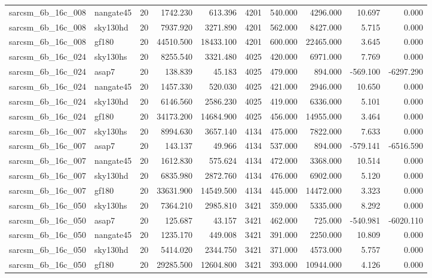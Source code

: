\documentclass{article}
\begin{document}
\begin{longtable}{llrrrrrrrr}
sarcsm\_6b\_16c\_008 & nangate45 & 20 & 1742.230 & 613.396 & 4201 & 540.000 & 4296.000 & 10.697 & 0.000 \\
sarcsm\_6b\_16c\_008 & sky130hd & 20 & 7937.920 & 3271.890 & 4201 & 562.000 & 8427.000 & 5.715 & 0.000 \\
sarcsm\_6b\_16c\_008 & gf180 & 20 & 44510.500 & 18433.100 & 4201 & 600.000 & 22465.000 & 3.645 & 0.000 \\
sarcsm\_6b\_16c\_024 & sky130hs & 20 & 8255.540 & 3321.480 & 4025 & 420.000 & 6971.000 & 7.769 & 0.000 \\
sarcsm\_6b\_16c\_024 & asap7 & 20 & 138.839 & 45.183 & 4025 & 479.000 & 894.000 & -569.100 & -6297.290 \\
sarcsm\_6b\_16c\_024 & nangate45 & 20 & 1457.330 & 520.030 & 4025 & 421.000 & 2946.000 & 10.650 & 0.000 \\
sarcsm\_6b\_16c\_024 & sky130hd & 20 & 6146.560 & 2586.230 & 4025 & 419.000 & 6336.000 & 5.101 & 0.000 \\
sarcsm\_6b\_16c\_024 & gf180 & 20 & 34173.200 & 14684.900 & 4025 & 456.000 & 14955.000 & 3.464 & 0.000 \\
sarcsm\_6b\_16c\_007 & sky130hs & 20 & 8994.630 & 3657.140 & 4134 & 475.000 & 7822.000 & 7.633 & 0.000 \\
sarcsm\_6b\_16c\_007 & asap7 & 20 & 143.137 & 49.966 & 4134 & 537.000 & 894.000 & -579.141 & -6516.590 \\
sarcsm\_6b\_16c\_007 & nangate45 & 20 & 1612.830 & 575.624 & 4134 & 472.000 & 3368.000 & 10.514 & 0.000 \\
sarcsm\_6b\_16c\_007 & sky130hd & 20 & 6835.980 & 2872.760 & 4134 & 476.000 & 6902.000 & 5.120 & 0.000 \\
sarcsm\_6b\_16c\_007 & gf180 & 20 & 33631.900 & 14549.500 & 4134 & 445.000 & 14472.000 & 3.323 & 0.000 \\
sarcsm\_6b\_16c\_050 & sky130hs & 20 & 7364.210 & 2985.810 & 3421 & 359.000 & 5335.000 & 8.292 & 0.000 \\
sarcsm\_6b\_16c\_050 & asap7 & 20 & 125.687 & 43.157 & 3421 & 462.000 & 725.000 & -540.981 & -6020.110 \\
sarcsm\_6b\_16c\_050 & nangate45 & 20 & 1235.170 & 449.008 & 3421 & 391.000 & 2250.000 & 10.809 & 0.000 \\
sarcsm\_6b\_16c\_050 & sky130hd & 20 & 5414.020 & 2344.750 & 3421 & 371.000 & 4573.000 & 5.757 & 0.000 \\
sarcsm\_6b\_16c\_050 & gf180 & 20 & 29285.500 & 12604.800 & 3421 & 393.000 & 10944.000 & 4.126 & 0.000 \\

\end{longtable}
\end{document}
